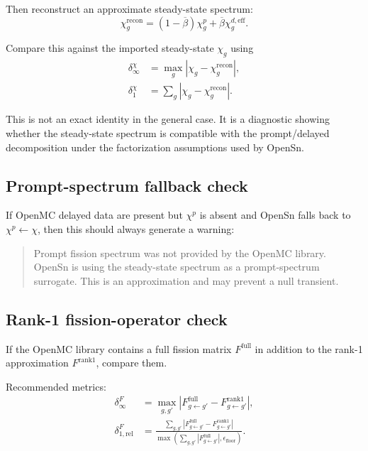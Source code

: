 \documentclass[11pt]{article}
\begin{document}
Then reconstruct an approximate steady-state spectrum:
\begin{equation}
  \chi_g^{\mathrm{recon}} =
  (1-\overline{\beta}) \chi_g^p + \overline{\beta}\chi_g^{d,\mathrm{eff}}.
\end{equation}

Compare this against the imported steady-state \(\chi_g\) using
\begin{align}
  \delta^{\chi}_{\infty} &= \max_g \left|\chi_g - \chi_g^{\mathrm{recon}}\right|, \\
  \delta^{\chi}_{1} &= \sum_g \left|\chi_g - \chi_g^{\mathrm{recon}}\right|.
\end{align}

This is not an exact identity in the general case. It is a diagnostic showing whether the
steady-state spectrum is compatible with the prompt/delayed decomposition under the
factorization assumptions used by OpenSn.

\subsection{Prompt-spectrum fallback check}

If OpenMC delayed data are present but \(\chi^p\) is absent and OpenSn falls back to
\(\chi^p \leftarrow \chi\), then this should always generate a warning:

\begin{quote}
  Prompt fission spectrum was not provided by the OpenMC library. OpenSn is using the
  steady-state spectrum as a prompt-spectrum surrogate. This is an approximation and may
  prevent a null transient.
\end{quote}

\subsection{Rank-1 fission-operator check}

If the OpenMC library contains a full fission matrix \(F^{\mathrm{full}}\) in addition to the
rank-1 approximation \(F^{\mathrm{rank1}}\), compare them.

Recommended metrics:
\begin{align}
  \delta^F_{\infty} &= \max_{g,g'} \left|F^{\mathrm{full}}_{g \leftarrow g'} -
                                      F^{\mathrm{rank1}}_{g \leftarrow g'}\right|, \\
  \delta^F_{1,\mathrm{rel}} &=
  \frac{\sum_{g,g'} \left|F^{\mathrm{full}}_{g \leftarrow g'} -
                        F^{\mathrm{rank1}}_{g \leftarrow g'}\right|}
       {\max\!\left(\sum_{g,g'} \left|F^{\mathrm{full}}_{g \leftarrow g'}\right|,
                    \epsilon_{\mathrm{floor}}\right)}.
\end{align}
\end{document}
